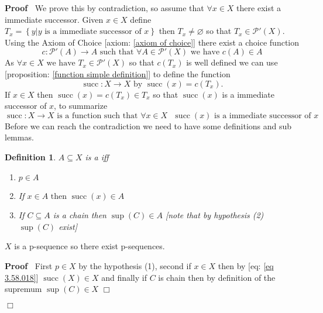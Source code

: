 \documentclass{book}
\newcommand{\tmop}[1]{\ensuremath{\operatorname{#1}}}
\newcommand{\tmtextbf}[1]{\text{{\bfseries{#1}}}}
\newenvironment{proof}{\noindent\textbf{Proof\ }}{\hspace*{\fill}$\Box$\medskip}
\newtheorem{definition}{Definition}
{\theorembodyfont{\rmfamily}\newtheorem{example}{Example}}
\begin{document}
\begin{proof}
  We prove this by contradiction, so assume that $\forall x \in X$ there exist
  a immediate successor. Given $x \in X$ define $T_x = \left\{ y|y \text{ is a
  immediate successor of } x \right\}$ then $T_x \neq \varnothing$ so that
  $T_x \in \mathcal{P}' (X)$. Using the Axiom of Choice [axiom: \ref{axiom of
  choice}] there exist a choice function
  \begin{equation}
    \label{eq 3.57.018} c : \mathcal{P}' (A) \rightarrow A \text{ such that
    $\forall A \in \mathcal{P}' (X)$ we have } c (A) \in A
  \end{equation}
  As $\forall x \in X \text{ we have } T_x \in \mathcal{P}' (X)$ so that $c
  (T_x)$ is well defined we can use [proposition: \ref{function simple
  definition}] to define the function
  \[ \tmop{succ} : X \rightarrow X \text{ by } \tmop{succ} (x) = c (T_x) . \]
  If $x \in X$ then $\tmop{succ} (x) = c (T_x) \in T_x$ so that $\tmop{succ}
  (x)$ is a immediate successor of $x$, to summarize
  \begin{equation}
    \label{eq 3.58.018} \tmop{succ} : X \rightarrow X \text{ is a function
    such that } \forall x \in X \text{ } \tmop{succ} (x) \text{ is a immediate
    successor of } x
  \end{equation}
  Before we can reach the contradiction we need to have some definitions and
  sub lemmas.
  
  \begin{definition}
    \label{choice lemma p-sequence}$A \subseteq X$ is a \tmtextbf{p-sequence}
    iff
    \begin{enumerate}
      \item $p \in A$
      
      \item If $x \in A \text{ then } \tmop{succ} (x) \in A$
      
      \item If $C \subseteq A$ is a chain then $\sup (C) \in A$ [note that by
      hypothesis (2) $\sup (C)$ exist]
    \end{enumerate}
  \end{definition}
  
  \begin{note}
    $X$ is a p-sequence so there exist p-sequences.
  \end{note}
  
  \begin{proof}
    First $p \in X$ by the hypothesis (1), second if $x \in X$ then by [eq:
    \ref{eq 3.58.018}] $\tmop{succ} (X) \in X$ and finally if $C$ is chain
    then by definition of the supremum $\sup (C) \in X$
  \end{proof}
  

\end{proof}
\end{document}
